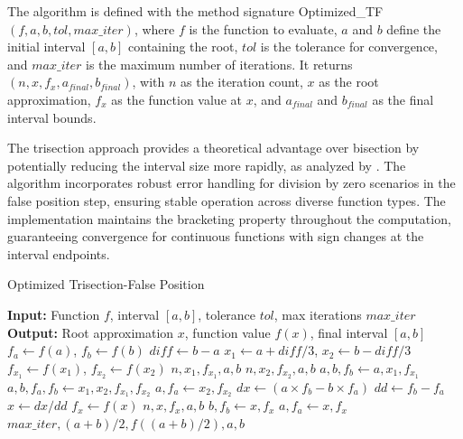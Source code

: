 \documentclass[amsmath, amssymb, aps]{revtex4-2}
\begin{document}
The algorithm is defined with the method signature Optimized\_TF$(f, a, b, tol, max\_iter)$, where $f$ is the function to evaluate, $a$ and $b$ define the initial interval $[a, b]$ containing the root, $tol$ is the tolerance for convergence, and $max\_iter$ is the maximum number of iterations. It returns $(n, x, f_x, a_{final}, b_{final})$, with $n$ as the iteration count, $x$ as the root approximation, $f_x$ as the function value at $x$, and $a_{final}$ and $b_{final}$ as the final interval bounds.

The trisection approach provides a theoretical advantage over bisection by potentially reducing the interval size more rapidly, as analyzed by \cite{demir2008trisection}. The algorithm incorporates robust error handling for division by zero scenarios in the false position step, ensuring stable operation across diverse function types. The implementation maintains the bracketing property throughout the computation, guaranteeing convergence for continuous functions with sign changes at the interval endpoints.

\begin{algorithm}[H]
\caption{Optimized Trisection-False Position}
\begin{algorithmic}[1]
\State \textbf{Input:} Function $f$, interval $[a, b]$, tolerance $tol$, max iterations $max\_iter$
\State \textbf{Output:} Root approximation $x$, function value $f(x)$, final interval $[a, b]$
\State $f_a \gets f(a)$, $f_b \gets f(b)$
    \State $diff \gets b - a$
    \State $x_1 \gets a + diff/3$, $x_2 \gets b - diff/3$
    \State $f_{x_1} \gets f(x_1)$, $f_{x_2} \gets f(x_2)$
        \State \Return $n, x_1, f_{x_1}, a, b$
    \EndIf
        \State \Return $n, x_2, f_{x_2}, a, b$
    \EndIf
        \State $a, b, f_b \gets a, x_1, f_{x_1}$
        \State $a, b, f_a, f_b \gets x_1, x_2, f_{x_1}, f_{x_2}$
    \Else
        \State $a, f_a \gets x_2, f_{x_2}$
    \EndIf
    \State $dx \gets (a \times f_b - b \times f_a)$
    \State $dd \gets f_b - f_a$
    \State $x \gets dx / dd$
    \State $f_x \gets f(x)$
        \State \Return $n, x, f_x, a, b$
    \EndIf
        \State $b, f_b \gets x, f_x$
    \Else
        \State $a, f_a \gets x, f_x$
    \EndIf
\EndFor
\State \Return $max\_iter, (a + b)/2, f((a + b)/2), a, b$
\end{algorithmic}
\end{algorithm}
\end{document}
